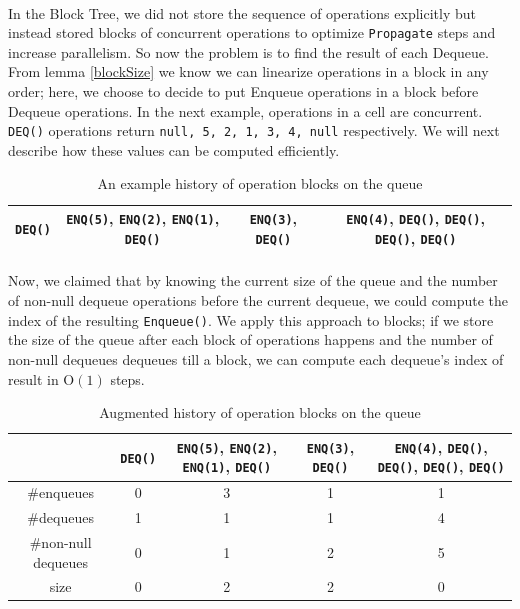 \documentclass[10pt]{article}
\theoremstyle{definition}
\begin{document}

\paragraph{}
In the Block Tree, we did not store the sequence of operations explicitly but instead stored blocks of concurrent operations to optimize \texttt{Propagate} steps and increase parallelism. So now the problem is to find the result of each Dequeue. From lemma \ref{blockSize} we know we can linearize operations in a block in any order; here, we choose to decide to put Enqueue operations in a block before Dequeue operations. In the next example, operations in a cell are concurrent. \texttt{DEQ()} operations return \texttt{null, 5, 2, 1, 3, 4, null} respectively. We will next describe how these values can be computed efficiently.

\begin{table}[hbt]
\centering
  \begin{tabular}{c|c|c|c}
    \hline \texttt{DEQ()} & \texttt{ENQ(5)}, \texttt{ENQ(2)}, \texttt{ENQ(1)}, \texttt{DEQ()}& \texttt{ENQ(3)}, \texttt{DEQ()}&  \texttt{ENQ(4)}, \texttt{DEQ()}, \texttt{DEQ()}, \texttt{DEQ()}, \texttt{DEQ()}\\ \hline
  \end{tabular}
  \caption{An example history of operation blocks on the queue}
\end{table}


\paragraph{}
Now, we claimed that by knowing the current size of the queue and the number of non-null dequeue operations before the current dequeue, we could compute the index of the resulting \texttt{Enqueue()}. We apply this approach to blocks; if we store the size of the queue after each block of operations happens and the number of non-null dequeues dequeues till a block, we can compute each dequeue's index of result in \textsc{O}$(1)$ steps.

\begin{table}[hbt]
\centering
  \begin{tabular}{c|c|c|c|c}
    \hline &\texttt{DEQ()} & \texttt{ENQ(5)}, \texttt{ENQ(2)}, \texttt{ENQ(1)}, \texttt{DEQ()}& \texttt{ENQ(3)}, \texttt{DEQ()}&  \texttt{ENQ(4)}, \texttt{DEQ()}, \texttt{DEQ()}, \texttt{DEQ()}, \texttt{DEQ()}\\ \hline
    \#enqueues & 0 & 3 & 1 & 1 \\ \hline
        \#dequeues & 1 & 1 & 1 & 4 \\ \hline
            \#non-null dequeues & 0 & 1 & 2 & 5 \\ \hline
                size & 0 & 2 & 2 & 0 \\ \hline
  \end{tabular}
  \caption{Augmented history of operation blocks on the queue}
\end{table}
\end{document}
